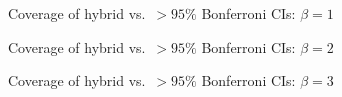 \documentclass{beamer}
\begin{document}
\begin{frame}
\begin{figure}[h]
  \centering
%  
  
  \caption{Coverage of hybrid vs.\ $>95\%$ Bonferroni CIs: $\beta = 1$}
\end{figure}

\end{frame}
\begin{frame}
\begin{figure}[h]
  \centering
%  
  
  \caption{Coverage of hybrid vs.\ $>95\%$ Bonferroni CIs: $\beta = 2$}
\end{figure}

\end{frame}
\begin{frame}
\begin{figure}[h]
  \centering
%  
  \caption{Coverage of hybrid vs.\ $>95\%$ Bonferroni CIs: $\beta = 3$}
  
\end{figure}
\end{frame}
\end{document}
